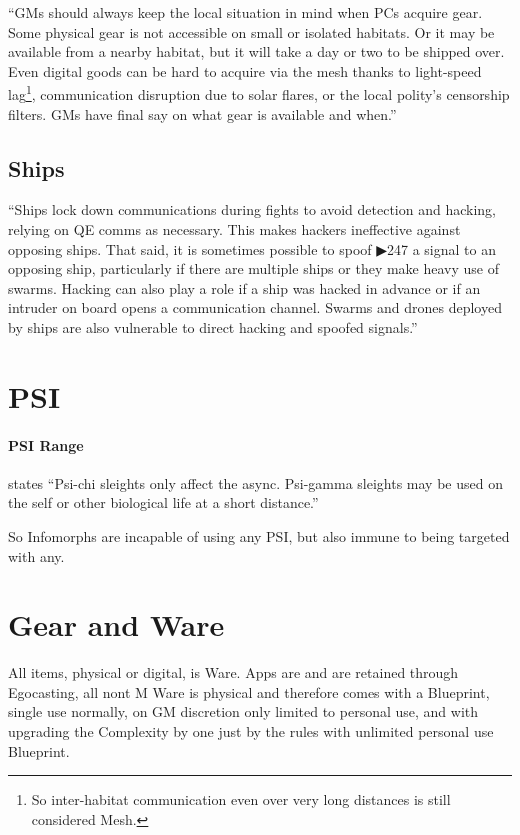 “GMs should always keep the local situation in mind when PCs acquire gear. Some physical gear is not accessible on small or isolated habitats. Or it may be available from a nearby habitat, but it will take a day or two to be shipped over. Even digital goods can be hard to acquire via the mesh thanks to light-speed lag\footnote{So inter-habitat communication even over very long distances is still considered Mesh.}, communication disruption due to solar flares, or the local polity’s censorship filters. GMs have final say on what gear is available and when.” \citep[pg. 313]{ep2e_1.1_2019}

\subsection{Ships}

“Ships lock down communications during fights to avoid detection and hacking, relying on QE comms as necessary. This makes hackers ineffective against opposing ships. That said, it is sometimes possible to spoof ▶247 a signal to an opposing ship, particularly if there are multiple ships or they make heavy use of swarms. Hacking can also play a role if a ship was hacked in advance or if an intruder on board opens a communication channel. Swarms and drones deployed by ships are also vulnerable to direct hacking and spoofed signals.” \citep[pg. 303]{ep2e_1.1_2019}



\section{PSI}

\paragraph{PSI Range} states “Psi-chi sleights only affect the async. Psi-gamma sleights may be used on the self or other biological life at a short distance.” \citep[pg. 276]{ep2e_1.1_2019}

So Infomorphs are incapable of using any PSI, but also immune to being targeted with any.


\section{Gear and Ware}

All items, physical or digital, is \gls{Ware}. Apps are  and are retained through \gls{Egocasting}, all nont M \gls{Ware} is physical and therefore comes with a \gls{Blueprint}, single use normally, on GM discretion only limited to personal use, and with upgrading the Complexity by one just by the rules with unlimited personal use \gls{Blueprint}.
